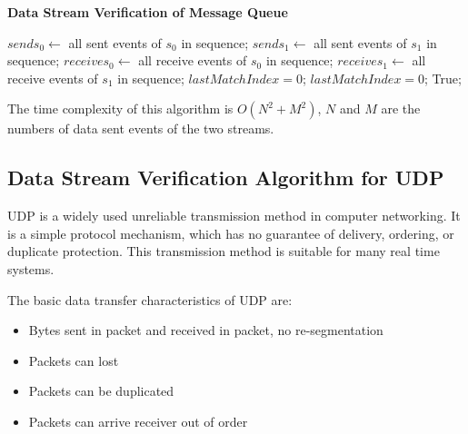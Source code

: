 \begin{algorithm}[H]
\DontPrintSemicolon
\caption{{\bf Data Stream Verification of Message Queue } \label{dataAlg3}}
\;
$sends_0 \leftarrow$ all sent events of $s_0$ in sequence;\;
$sends_1 \leftarrow$ all sent events of $s_1$ in sequence;\;
$receives_0 \leftarrow$ all receive events of $s_0$ in sequence;\;
$receives_1 \leftarrow$ all receive events of $s_1$ in sequence;\;
$lastMatchIndex = 0$;\;
$lastMatchIndex = 0$;\;
 \KwRet True;\;
\end{algorithm} 

The time complexity of this algorithm is $O(N^2+M^2)$, $N$ and $M$ are the numbers of data sent events of the two streams.

\subsection{Data Stream Verification Algorithm for UDP}
UDP is a widely used unreliable transmission method in computer networking. It is a simple protocol mechanism, which has no guarantee of delivery, ordering, or duplicate protection. This transmission method is suitable for many real time systems. 

The basic data transfer characteristics of UDP are:
\begin{itemize}
  \item Bytes sent in packet and received in packet, no re-segmentation
  \item Packets can lost
  \item Packets can be duplicated
  \item Packets can arrive receiver out of order
\end{itemize}

